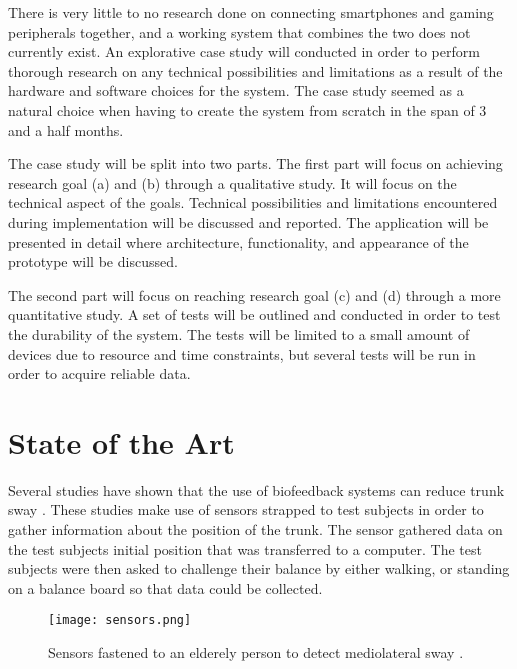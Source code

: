 

There is very little to no research done on connecting smartphones and gaming peripherals together, and a working system that combines the two does not currently exist. An explorative case study will conducted in order to perform thorough research on any technical possibilities and limitations as a result of the hardware and software choices for the system. The case study seemed as a natural choice when having to create the system from scratch in the span of 3 and a half months.

The case study will be split into two parts. The first part will focus on achieving research goal (a) and (b) through a qualitative study. It will focus on the technical aspect of the goals. Technical possibilities and limitations encountered during implementation will be discussed and reported. The application will be presented in detail where architecture, functionality, and appearance of the prototype will be discussed.

The second part will focus on reaching research goal (c) and (d) through a more quantitative study. A set of tests will be outlined and conducted in order to test the durability of the system. The tests will be limited to a small amount of devices due to resource and time constraints, but several tests will be run in order to acquire reliable data.

\section{State of the Art}

Several studies have shown that the use of biofeedback systems can reduce trunk sway \cite{multiModualBiofeedback, vibrotactileBiofeedback, vibrotactileTiltFeedback}. These studies make use of sensors strapped to test subjects in order to gather information about the position of the trunk. The sensor gathered data on the test subjects initial position that was transferred to a computer. The test subjects were then asked to challenge their balance by either walking, or standing on a balance board so that data could be collected.

\begin{figure}[h!]
  \centering
    \texttt{[image: sensors.png]}
    \caption{\footnotesize Sensors fastened to an elderely person to detect mediolateral sway \cite{vibrotactileTiltFeedback}.}
\end{figure}

